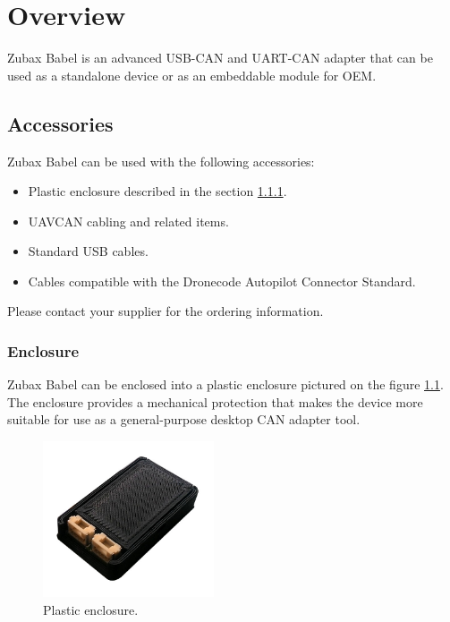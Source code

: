 \documentclass{zubaxdoc}
\begin{document}
\chapter{Overview}

Zubax Babel is an advanced USB-CAN and UART-CAN adapter
that can be used as a standalone device or as an embeddable module for
OEM.

\section{Accessories}

Zubax Babel can be used with the following accessories:
\begin{itemize}
    \item Plastic enclosure described in the section \ref{sec:enclosure}.
    \item UAVCAN cabling and related items.
    \item Standard USB cables.
    \item Cables compatible with the Dronecode Autopilot Connector Standard.
\end{itemize}

Please contact your supplier for the ordering information.

\subsection{Enclosure}\label{sec:enclosure}

Zubax Babel can be enclosed into a plastic enclosure pictured on the figure \ref{fig:enclosure}.
The enclosure provides a mechanical protection that makes the device more suitable for use as a
general-purpose desktop CAN adapter tool.

\begin{figure}[hb]
    \centering
    \includegraphics[width=0.45\textwidth]{housing}
    \caption{Plastic enclosure.\label{fig:enclosure}}
\end{figure}
\end{document}
